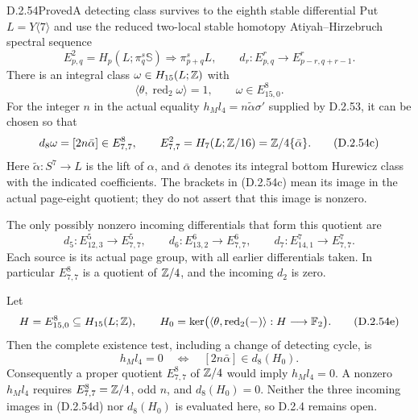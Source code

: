 \begin{claim}{D.2.54}{Proved}{A detecting class survives to the eighth stable differential}
Put $L=Y\langle7\rangle$ and use the reduced two-local
stable homotopy Atiyah--Hirzebruch spectral sequence
\[
 E^2_{p,q}=H_p(L;\pi_q^s\mathbb S)
       \Longrightarrow \pi_{p+q}^sL,
 \qquad d_r:E^r_{p,q}\longrightarrow E^r_{p-r,q+r-1}.
 \tag{D.2.54a}
\]
There is an integral class $\omega\in H_{15}(L;\mathbb Z)$ with
\[
 \langle\theta,\operatorname{red}_2\omega\rangle=1,
 \qquad \omega\in E^8_{15,0}.
 \tag{D.2.54b}
\]
For the integer $n$ in the actual equality
$h_Ml_4=n\widetilde\alpha\sigma'$ supplied by D.2.53,
it can be chosen so that
\[
 d_8\omega=[2n\bar\alpha]\in E^8_{7,7},
 \qquad E^2_{7,7}=H_7(L;\mathbb Z/16)=\mathbb Z/4\{\bar\alpha\}.
 \tag{D.2.54c}
\]
Here $\widetilde\alpha:S^7\to L$ is the lift of $\alpha$,
and $\bar\alpha$ denotes its integral bottom Hurewicz class
with the indicated coefficients.  The brackets in
\textup{(D.2.54c)} mean its image in the actual page-eight
quotient; they do not assert that this image is nonzero.

The only possibly nonzero incoming differentials that
form this quotient are
\[
 d_5:E^5_{12,3}\longrightarrow E^5_{7,7},\qquad
 d_6:E^6_{13,2}\longrightarrow E^6_{7,7},\qquad
 d_7:E^7_{14,1}\longrightarrow E^7_{7,7}.
 \tag{D.2.54d}
\]
Each source is its actual page group, with all earlier
differentials taken.  In particular $E^8_{7,7}$ is a
quotient of $\mathbb Z/4$, and the incoming $d_2$ is zero.

Let
\[
 H=E^8_{15,0}\subseteq H_{15}(L;\mathbb Z),\qquad
 H_0=\ker\bigl(\langle\theta,\operatorname{red}_2(-)\rangle:
                         H\longrightarrow\mathbb F_2\bigr).
 \tag{D.2.54e}
\]
Then the complete existence test, including a change of
detecting cycle, is
\[
             h_Ml_4=0
       \quad\Longleftrightarrow\quad
             [2n\bar\alpha]\in d_8(H_0).
 \tag{D.2.54f}
\]
Consequently a proper quotient $E^8_{7,7}$ of $\mathbb Z/4$
would imply $h_Ml_4=0$.  A nonzero $h_Ml_4$ requires
$E^8_{7,7}=\mathbb Z/4$, odd $n$, and $d_8(H_0)=0$.
Neither the three incoming images in \textup{(D.2.54d)}
nor $d_8(H_0)$ is evaluated here, so D.2.4 remains open.
\end{claim}
